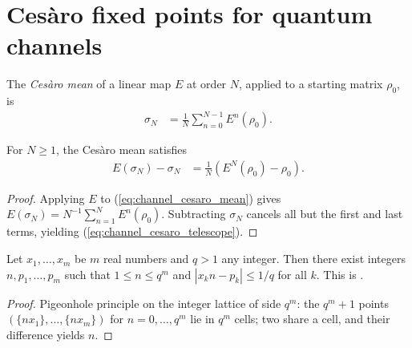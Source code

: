 \section{Ces\`aro fixed points for quantum channels}

\begin{definition}\label{def:cesaro_mean}
    \leanok
    The \emph{Ces\`aro mean} of a linear map $E$ at order $N$,
    applied to a starting matrix $\rho_0$, is
    \begin{align}
        \sigma_N
         & =\frac{1}{N}\sum_{n=0}^{N-1}E^n(\rho_0).
        \label{eq:channel_cesaro_mean}
    \end{align}
\end{definition}

\begin{theorem}\label{thm:cesaro_telescope}
    \leanok
    For $N\geq1$, the Ces\`aro mean satisfies
    \begin{align}
        E(\sigma_N)-\sigma_N
         & =\frac{1}{N}(E^N(\rho_0)-\rho_0).
        \label{eq:channel_cesaro_telescope}
    \end{align}
\end{theorem}

\begin{proof}\leanok{}
    Applying $E$ to (\ref{eq:channel_cesaro_mean}) gives
    $E(\sigma_N)=N^{-1}\sum_{n=1}^{N}E^n(\rho_0)$.
    Subtracting $\sigma_N$ cancels all but the first and last terms, yielding
    (\ref{eq:channel_cesaro_telescope}).
\end{proof}


\begin{lemma}
    \label{lem:dirichlet_simultaneous}
    \leanok
    \uses{}
    Let $x_1,\dots,x_m$ be $m$ real numbers and $q>1$ any integer.
    Then there exist integers $n,p_1,\dots,p_m$ such that
    $1\le n\le q^m$ and $|x_k n-p_k|\le 1/q$ for all $k$.
    This is \cite[Lemma~6.1]{Wolf2012Quantum}.
\end{lemma}

\begin{proof}\leanok
    Pigeonhole principle on the integer lattice of side $q^m$: the
    $q^m+1$ points $(\{nx_1\},\dots,\{nx_m\})$ for $n=0,\dots,q^m$
    lie in $q^m$ cells; two share a cell, and their difference yields $n$.
\end{proof}


